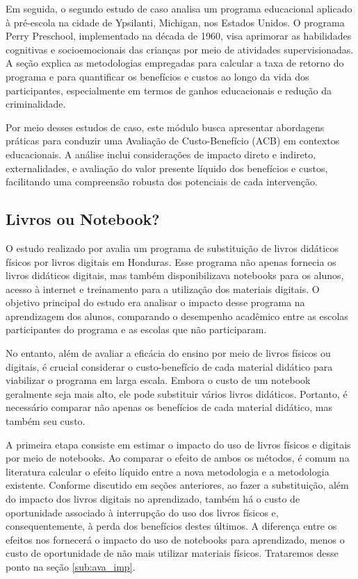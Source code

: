 \documentclass[12pt,letterpaper]{article}
\newcommand{\1}{\mathbbm{1}}
\numberwithin{equation}{section}
\begin{document}
Em seguida, o segundo estudo de caso analisa um programa educacional aplicado à pré-escola na cidade de Ypsilanti, Michigan, nos Estados Unidos. O programa Perry Preschool, implementado na década de 1960, visa aprimorar as habilidades cognitivas e socioemocionais das crianças por meio de atividades supervisionadas. A seção explica as metodologias empregadas para calcular a taxa de retorno do programa e para quantificar os benefícios e custos ao longo da vida dos participantes, especialmente em termos de ganhos educacionais e redução da criminalidade.

Por meio desses estudos de caso, este módulo busca apresentar abordagens práticas para conduzir uma Avaliação de Custo-Benefício (ACB) em contextos educacionais. A análise inclui considerações de impacto direto e indireto, externalidades, e avaliação do valor presente líquido dos benefícios e custos, facilitando uma compreensão robusta dos potenciais de cada intervenção.

\subsection{Livros ou Notebook?}
\label{subsec:livros_ou_notebook}

O estudo realizado por \textcite{bando2016books} avalia um programa de substituição de livros didáticos físicos por livros digitais em Honduras. Esse programa não apenas fornecia os livros didáticos digitais, mas também disponibilizava notebooks para os alunos, acesso à internet e treinamento para a utilização dos materiais digitais. O objetivo principal do estudo era analisar o impacto desse programa na aprendizagem dos alunos, comparando o desempenho acadêmico entre as escolas participantes do programa e as escolas que não participaram.

No entanto, além de avaliar a eficácia do ensino por meio de livros físicos ou digitais, é crucial considerar o custo-benefício de cada material didático para viabilizar o programa em larga escala. Embora o custo de um notebook geralmente seja mais alto, ele pode substituir vários livros didáticos. Portanto, é necessário comparar não apenas os benefícios de cada material didático, mas também seu custo.

A primeira etapa consiste em estimar o impacto do uso de livros físicos e digitais por meio de notebooks. Ao comparar o efeito de ambos os métodos, é comum na literatura calcular o efeito líquido entre a nova metodologia e a metodologia existente. Conforme discutido em seções anteriores, ao fazer a substituição, além do impacto dos livros digitais no aprendizado, também há o custo de oportunidade associado à interrupção do uso dos livros físicos e, consequentemente, à perda dos benefícios destes últimos. A diferença entre os efeitos nos fornecerá o impacto do uso de notebooks para aprendizado, menos o custo de oportunidade de não mais utilizar materiais físicos. Trataremos desse ponto na seção \ref{sub:ava_imp}.
\end{document}
